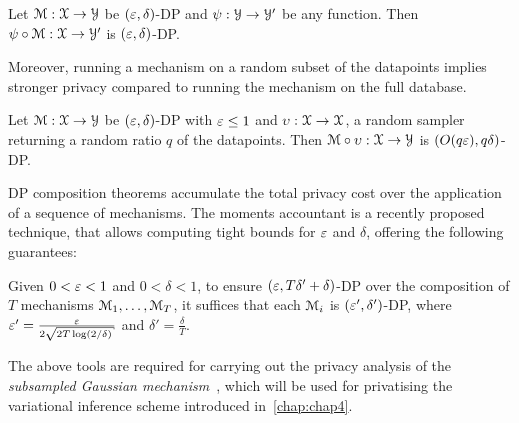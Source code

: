 	Let $ {\mathcal{M}: \mathcal{X} \rightarrow \mathcal{Y}}$ be $(\varepsilon, \delta)$-DP and $\psi:\mathcal{Y} \rightarrow \mathcal{Y}'$ be any function. Then $\psi \circ \mathcal{M}: \mathcal{X} \rightarrow \mathcal{Y}'$ is $(\varepsilon, \delta)$-DP.
	\label{prop:bdp-postprocessing}
\enprop

Moreover, running a mechanism on a random subset of the datapoints implies stronger privacy compared to running the mechanism on the full database.

Let $ \mathcal{M}: \mathcal{X} \rightarrow \mathcal{Y}$ be $(\varepsilon, \delta)$-DP with $\varepsilon \leq 1$ and $\upsilon: \mathcal{X} \rightarrow \mathcal{X}$, a random sampler returning a random ratio $q$ of the datapoints. Then $\mathcal{M} \circ \upsilon: \mathcal{X} \rightarrow \mathcal{Y}$ is $(O(q\varepsilon), q\delta)$-DP.
\label{prop:bdp-sampling}
\enprop

DP composition theorems accumulate the total privacy cost over the application of a sequence of mechanisms. The moments accountant is a recently proposed technique, that allows computing tight bounds for $\varepsilon$ and $\delta$, offering the following guarantees:

Given $0<\varepsilon<1$ and $0<\delta<1$, to ensure $(\varepsilon, T\delta'+\delta)$-DP over the composition of $T$ mechanisms $\mathcal{M}_1,\ldots,\mathcal{M}_T$, it suffices that each $\mathcal{M}_i$ is $(\varepsilon', \delta')$-DP, where $\veps'=\frac{\veps}{2\sqrt{2T\log(2/\delta)}}$ and $\delta'=\frac{\delta}{T}$. 
\label{prop:bmoments-accountant}
\enprop

The above tools are required for carrying out the privacy analysis of the \emph{subsampled Gaussian mechanism}~\citep{abadi16}, which will be used for privatising the variational inference scheme introduced in~\cref{chap:chap4}.



